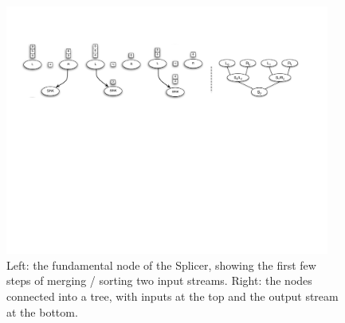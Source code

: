 \begin{figure}[!h]
 \centering
 \includegraphics[width=0.95\textwidth]{graphics/online/pdaq/fig_hkn1_v2.pdf}
 \caption{Left: the fundamental node of the Splicer, showing the
   first few steps of merging / sorting two input streams.  Right: the
   nodes connected into a tree, with inputs at the top and the output
   stream at the bottom.  }
 \label{fig:hkn1}
\end{figure}




